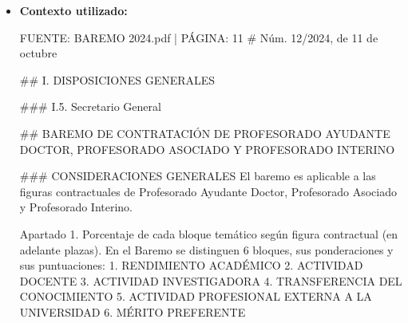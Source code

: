 \documentclass{article}
\begin{document}
\begin{itemize}
\begin{itemize}
                \#\#\# Desglose de la Actividad Profesional Externa a la Universidad (Bloque V):

                La experiencia profesional o laboral se evalúa dentro del Bloque V, que tiene un peso relativo del 55\% en la nota final del proceso para la figura de Profesor Asociado. Este bloque se refiere a la actividad profesional externa a la universidad, lo que incluye experiencia laboral en el sector privado, instituciones públicas, o cualquier otra actividad profesional relevante fuera del ámbito académico universitario.

                \#\#\# Porcentaje de Peso Relativo de la Experiencia Profesional o Laboral:

                El porcentaje de peso relativo de la experiencia profesional o laboral en la nota final del proceso para la figura de Profesor Asociado es del 55\%. Esto significa que más de la mitad de la puntuación total se basa en la evaluación de la experiencia profesional o laboral del candidato, lo que destaca la importancia de esta experiencia en el proceso de selección para esta figura contractual.
          \item \textbf{Contexto utilizado:}
                \begin{scriptsize}
                  FUENTE: BAREMO 2024.pdf | PÁGINA: 11
                  \# Núm. 12/2024, de 11 de octubre

                  \#\# I. DISPOSICIONES GENERALES

                  \#\#\# I.5. Secretario General

                  \#\# BAREMO DE CONTRATACIÓN DE PROFESORADO AYUDANTE DOCTOR, PROFESORADO ASOCIADO Y PROFESORADO INTERINO

                  \#\#\# CONSIDERACIONES GENERALES
                  El baremo es aplicable a las figuras contractuales de Profesorado Ayudante Doctor, Profesorado Asociado y Profesorado Interino.

                  Apartado 1. Porcentaje de cada bloque temático según figura contractual (en adelante plazas).
                  En el Baremo se distinguen 6 bloques, sus ponderaciones y sus puntuaciones:
                  1. RENDIMIENTO ACADÉMICO
                  2. ACTIVIDAD DOCENTE
                  3. ACTIVIDAD INVESTIGADORA
                  4. TRANSFERENCIA DEL CONOCIMIENTO
                  5. ACTIVIDAD PROFESIONAL EXTERNA A LA UNIVERSIDAD
                  6. MÉRITO PREFERENTE


\end{scriptsize}
\end{itemize}
\end{itemize}
\end{document}
